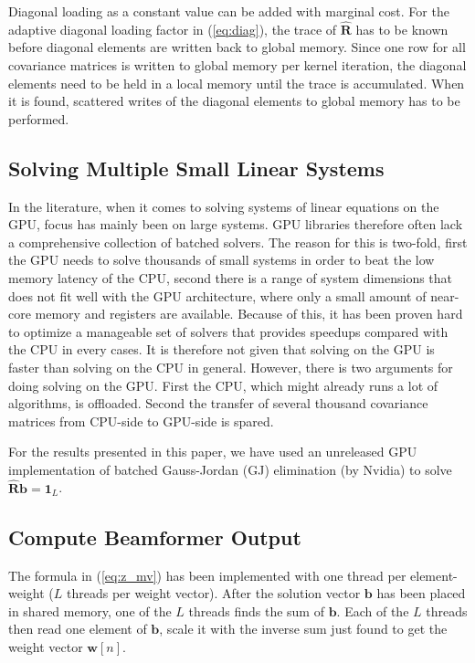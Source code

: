 \documentclass[conference]{IEEEtran}
\newcommand{\mat}[1]{\mathbf{#1}}
\renewcommand{\vec}[1]{\mathbf{#1}}
\begin{document}
Diagonal loading as a constant value can be added with marginal cost. For the adaptive diagonal loading factor in (\ref{eq:diag}), the trace of $\mat{\hat{R}}$ has to be known before diagonal elements are written back to global memory. Since one row for all covariance matrices is written to global memory per kernel iteration, the diagonal elements need to be held in a local memory until the trace is accumulated. When it is found, scattered writes of the diagonal elements to global memory has to be performed. 

\subsection{Solving Multiple Small Linear Systems}
In the literature, when it comes to solving systems of linear equations on the GPU, focus has mainly been on large systems. GPU libraries therefore often lack a comprehensive collection of batched solvers. The reason for this is two-fold, first the GPU needs to solve thousands of small systems in order to beat the low memory latency of the CPU, second there is a range of system dimensions that does not fit well with the GPU architecture, where only a small amount of near-core memory and registers are available. Because of this, it has been proven hard to optimize a manageable set of solvers that provides speedups compared with the CPU in every cases. It is therefore not given that solving on the GPU is faster than solving on the CPU in general. However, there is two arguments for doing solving on the GPU. First the CPU, which might already runs a lot of algorithms, is offloaded. Second the transfer of several thousand covariance matrices from CPU-side to GPU-side is spared.

For the results presented in this paper, we have used an unreleased GPU implementation of batched Gauss-Jordan (GJ) elimination (by Nvidia) to solve $\mat{\hat{R}}\vec{b} = \vec{1}_L$.

\subsection{Compute Beamformer Output}
The formula in (\ref{eq:z_mv}) has been implemented with one thread per element-weight ($L$ threads per weight vector). After the solution vector $\vec{b}$ has been placed in shared memory, one of the $L$ threads finds the sum of $\vec{b}$. Each of the $L$ threads then read one element of $\vec{b}$, scale it with the inverse sum just found to get the weight vector $\vec{w}[n]$. 
\end{document}
